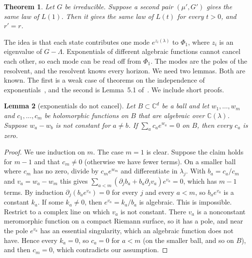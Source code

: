 \documentclass[11pt]{article}
\newtheorem{theorem}{Theorem}[section]
\newtheorem{lemma}[theorem]{Lemma}
\theoremstyle{definition}
\theoremstyle{remark}
\newcommand{\C}{\mathbb C}
\begin{document}
\begin{theorem}\label{thm:horizon}
Let $G$ be irreducible. Suppose a second pair $(\mu',G')$ gives the same law of
$L(1)$. Then it gives the same law of $L(t)$ for every $t>0$, and $r'=r$.
\end{theorem}

The idea is that each state contributes one mode $e^{z_i(\lambda)}$ to
$\Phi_1$, where $z_i$ is an eigenvalue of $G-\Lambda$. Exponentials of different
algebraic functions cannot cancel each other, so each mode can be read off from
$\Phi_1$. The modes are the poles of the resolvent, and the resolvent knows every
horizon. We need two lemmas. Both are known. The first is a weak case of
theorems on the independence of exponentials~\cite{ax1971}, and the second is
Lemma~5.1 of~\cite{alahmadieh2026}. We include short proofs.

\begin{lemma}[exponentials do not cancel]\label{lem:exp}
Let $B\subset\C^d$ be a ball and let $w_1,\ldots,w_m$ and $c_1,\ldots,c_m$ be
holomorphic functions on $B$ that are algebraic over $\C(\lambda)$. Suppose
$w_a-w_b$ is not constant for $a\ne b$. If $\sum_ac_ae^{w_a}=0$ on $B$, then
every $c_a$ is zero.
\end{lemma}
\begin{proof}
We use induction on $m$. The case $m=1$ is clear. Suppose the claim holds for
$m-1$ and that $c_m\ne0$ (otherwise we have fewer terms). On a smaller ball
where $c_m$ has no zero, divide by $c_me^{w_m}$ and differentiate in
$\lambda_j$. With $b_a=c_a/c_m$ and
$v_a=w_a-w_m$ this gives
$\sum_{a<m}(\partial_jb_a+b_a\partial_jv_a)e^{v_a}=0$, which has $m-1$ terms. By
induction $\partial_j(b_ae^{v_a})=0$ for every $j$ and every $a<m$, so
$b_ae^{v_a}$ is a constant $k_a$. If some $k_a\ne0$, then $e^{v_a}=k_a/b_a$ is
algebraic. This is impossible. Restrict to a complex line on which $v_a$ is not
constant. There $v_a$ is a nonconstant meromorphic function on a compact Riemann
surface, so it has a pole, and near the pole $e^{v_a}$ has an essential
singularity, which an algebraic function does not have. Hence every $k_a=0$, so
$c_a=0$ for $a<m$ (on the smaller ball, and so on $B$), and then $c_m=0$, which
contradicts our assumption.
\end{proof}
\end{document}
